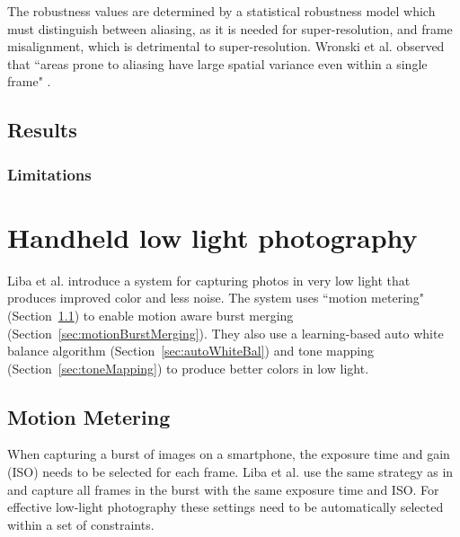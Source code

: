 \documentclass{sig-alternate}
\begin{document}
The robustness values are determined by a statistical robustness model which must distinguish between aliasing, as it is needed for super-resolution, and frame misalignment, which is detrimental to super-resolution. Wronski et al. observed that ``areas prone to aliasing have large spatial variance even within a single frame" \cite{Wronski2019}.



\subsection{Results}



\subsubsection{Limitations}

\section{Handheld low light photography}
\label{sec:handheldLowLight}

Liba et al. \cite{Liba2019} introduce a system for capturing photos in very low light that produces improved color and less noise. The system uses ``motion metering" (Section~\ref{sec:motionMetering}) to enable motion aware burst merging (Section~\ref{sec:motionBurstMerging}). They also use a learning-based auto white balance algorithm (Section~\ref{sec:autoWhiteBal}) and tone mapping (Section~\ref{sec:toneMapping}) to produce better colors in low light.


\subsection{Motion Metering}
\label{sec:motionMetering}

When capturing a burst of images on a smartphone, the exposure time and gain (ISO) needs to be selected for each frame. Liba et al. use the same strategy as in \cite{Hasinoff2016} and capture all frames in the burst with the same exposure time and ISO. For effective low-light photography these settings need to be automatically selected within a set of constraints.
\end{document}

